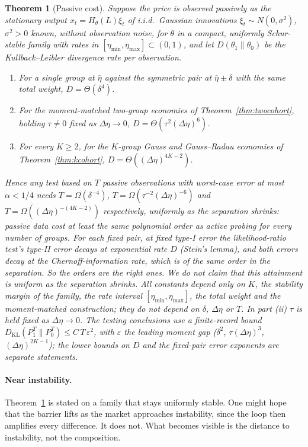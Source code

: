 \documentclass[12pt]{article}
\newtheorem{theorem}{Theorem}[section]
\theoremstyle{definition}
\theoremstyle{remark}
\newcommand{\KL}{D_{\mathrm{KL}}}
\begin{document}
\begin{theorem}[Passive cost]\label{prop:passive}
Suppose the price is observed passively as the stationary output $x_t=H_\theta(L)\xi_t$ of i.i.d.\ Gaussian innovations $\xi_t\sim N(0,\sigma^2)$, $\sigma^2>0$ known, without observation noise, for $\theta$ in a compact, uniformly Schur-stable family with rates in $[\eta_{\min},\eta_{\max}]\subset(0,1)$, and let $D(\theta_1\|\theta_0)$ be the Kullback--Leibler divergence rate per observation.
\begin{enumerate}[label=(\roman*)]
\item For a single group at $\bar\eta$ against the symmetric pair at $\bar\eta\pm\delta$ with the same total weight, $D=\Theta(\delta^4)$.
\item For the moment-matched two-group economies of Theorem~\ref{thm:twocohort}, holding $\tau\ne0$ fixed as $\Delta\eta\to0$, $D=\Theta(\tau^2(\Delta\eta)^6)$.
\item For every $K\ge2$, for the $K$-group Gauss and Gauss--Radau economies of Theorem~\ref{thm:kcohort}, $D=\Theta((\Delta\eta)^{4K-2})$.
\end{enumerate}
Hence any test based on $T$ passive observations with worst-case error at most $\alpha<1/4$ needs $T=\Omega(\delta^{-4})$, $T=\Omega(\tau^{-2}(\Delta\eta)^{-6})$ and $T=\Omega((\Delta\eta)^{-(4K-2)})$ respectively, uniformly as the separation shrinks: passive data cost at least the same polynomial order as active probing for every number of groups. For each fixed pair, at fixed type-I error the likelihood-ratio test's type-II error decays at exponential rate $D$ (Stein's lemma), and both errors decay at the Chernoff-information rate, which is of the same order in the separation. So the orders are the right ones. We do not claim that this attainment is uniform as the separation shrinks. All constants depend only on $K$, the stability margin of the family, the rate interval $[\eta_{\min},\eta_{\max}]$, the total weight and the moment-matched construction; they do not depend on $\delta$, $\Delta\eta$ or $T$. In part (ii) $\tau$ is held fixed as $\Delta\eta\to0$. The testing conclusions use a finite-record bound $\KL(P_1^T\|P_0^T)\le C\,T\,\varepsilon^2$, with $\varepsilon$ the leading moment gap ($\delta^2$, $\tau(\Delta\eta)^3$, $(\Delta\eta)^{2K-1}$); the lower bounds on $D$ and the fixed-pair error exponents are separate statements.
\end{theorem}



\paragraph{Near instability.} Theorem~\ref{prop:passive} is stated on a family that stays uniformly stable. One might hope that the barrier lifts as the market approaches instability, since the loop then amplifies every difference. It does not. What becomes visible is the distance to instability, not the composition.
\end{document}
